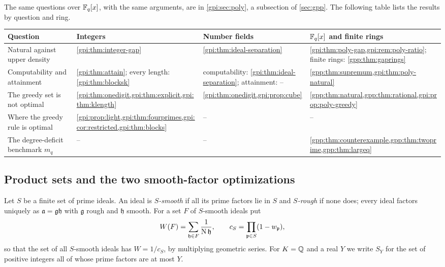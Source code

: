 The same questions over $\mathbb{F}_q[x]$, with the same arguments, are in \cref{gpi:sec:poly}, a
subsection of \cref{sec:gpp}. The following table lists the results by question and ring.
\begin{center}\small
\begin{tabular}{@{}>{\raggedright}p{2.9cm}>{\raggedright}p{3.6cm}>{\raggedright}p{2.9cm}>{\raggedright\arraybackslash}p{4.4cm}@{}}
\toprule
Question & Integers & Number fields & $\mathbb{F}_q[x]$ and finite rings\\
\midrule
Natural against upper density & \cref{gpi:thm:integer-gap} &
 \cref{gpi:thm:ideal-separation} &
 \cref{gpi:thm:poly-gap,gpi:rem:poly-ratio}; finite rings: \cref{gpp:thm:gaprings}\\
Computability and attainment & \cref{gpi:thm:attain}; every length:
 \cref{gpi:thm:blocksk} & computability: \cref{gpi:thm:ideal-separation}; attainment: -- &
 \cref{gpp:thm:supremum,gpi:thm:poly-natural}\\
The greedy set is not optimal &
 \cref{gpi:thm:onedigit,gpi:thm:explicit,gpi:thm:klength} &
 \cref{gpi:thm:onedigit,gpi:prop:cube} &
 \cref{gpp:thm:natural,gpp:thm:rational,gpi:prop:poly-greedy}\\
Where the greedy rule is optimal &
 \cref{gpi:prop:light,gpi:thm:fourprimes,gpi:cor:restricted,gpi:thm:blocks} & -- & --\\
The degree-deficit benchmark $m_q$ & -- & -- &
 \cref{gpp:thm:counterexample,gpp:thm:twoprime,gpp:thm:largeq}\\
\bottomrule
\end{tabular}
\end{center}

\subsection{Product sets and the two smooth-factor optimizations}\label{gpi:sec:local}
{\raggedright{}}

Let $S$ be a finite set of prime ideals. An ideal is \emph{$S$-smooth} if all its prime
factors lie in $S$ and \emph{$S$-rough} if none does; every ideal factors uniquely as
$\mathfrak a=\mathfrak g\mathfrak h$ with $\mathfrak g$ rough and $\mathfrak h$ smooth. For a
set $F$ of $S$-smooth ideals put
\[
 W(F)=\sum_{\mathfrak h\in F}\frac1{\operatorname{N}\mathfrak h},\qquad
 c_S=\prod_{\mathfrak p\in S}(1-w_{\mathfrak p}),
\]
so that the set of all $S$-smooth ideals has $W=1/c_S$, by multiplying geometric series. For
$K=\mathbb{Q}$ and a real $Y$ we write $S_Y$ for the set of positive integers all of whose prime
factors are at most $Y$.

